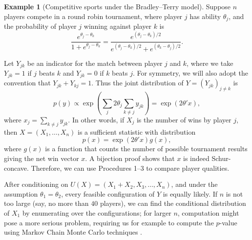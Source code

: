 \documentclass[aos, authoryear]{imsart}
\theoremstyle{definition}
\newtheorem{example}{Example}
\theoremstyle{custom}
\begin{document}
\begin{example}[Competitive sports under the Bradley--Terry model]
Suppose $n$ players compete in a round robin tournament, where player $j$ has ability $\theta_j$, and the probability of player $j$ winning against player $k$ is
\[\frac{e^{\theta_j - \theta_k}}{1 + e^{\theta_j - \theta_k}} = \frac{e^{\left(\theta_j - \theta_k\right) / 2}}{e^{\left(\theta_j - \theta_k\right) / 2} + e^{\left(\theta_k - \theta_j\right) / 2}}.\]

Let $Y_{jk}$ be an indicator for the match between player $j$ and $k$, where we take $Y_{jk} = 1$ if $j$ beats $k$ and $Y_{jk} = 0$ if $k$ beats $j$. For symmetry, we will also adopt the convention that $Y_{jk} + Y_{kj} = 1$. Thus the joint distribution of $Y=\left(Y_{jk}\right)_{j\neq k}$ is
\[p\left(y\right) \propto \exp\left(\sum_j 2\theta_j \sum_{k \ne j} y_{jk}\right)  = \exp\left(2\theta' x\right),\]
where $x_j = \sum_{k \ne j} y_{jk}$. In other words, if $X_j$ is the number of wins by player $j$, then $X=(X_1,\ldots,X_n)$ is a sufficient statistic with distribution
\[p\left(x\right) = \exp\left(2\theta' x\right) g\left(x\right),\]
where $g\left(x\right)$ is a function that counts the number of possible tournament results giving the net win vector $x$. A bijection proof shows that $x$ is indeed Schur-concave. Therefore, we can use Procedures 1--3 to compare player qualities.

After conditioning on $U(X) = (X_1 + X_2, X_3, \ldots, X_n)$, and under the assumption $\theta_1 = \theta_2$, every feasible configuration of $Y$ is equally likely. If $n$ is not too large (say, no more than $40$ players), we can find the conditional distribution of $X_1$ by enumerating over the configurations; for larger $n$, computation might pose a more serious problem, requiring us for example to compute the $p$-value using Markov Chain Monte Carlo techniques \citep{Besag:1989}.
\end{example}
\end{document}

